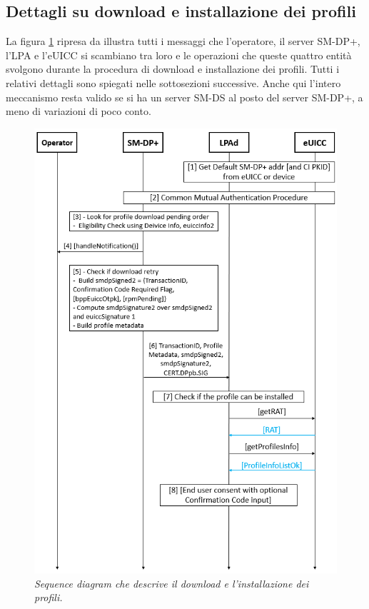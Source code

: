 \documentclass[10pt, oneside]{book}
\begin{document}
\subsection{Dettagli su download e installazione dei profili}\label{sec:down-install}
La figura \ref{fig:download-install} ripresa da \cite{GSMA-docs-new} illustra tutti i messaggi che l'operatore, il server SM-DP+, l'LPA e l'eUICC si scambiano tra loro e le operazioni che queste quattro entità svolgono durante la procedura di download e installazione dei profili. Tutti i relativi dettagli \cite{GSMA-docs-new} sono spiegati nelle sottosezioni successive. Anche qui l'intero meccanismo resta valido se si ha un server SM-DS al posto del server SM-DP+, a meno di variazioni di poco conto.
\begin{figure}
\includegraphics[width=\linewidth]{download-install.png}
\caption{\textit{Sequence diagram che descrive il download e l'installazione dei profili.}}
\label{fig:download-install}
\end{figure}
\end{document}
